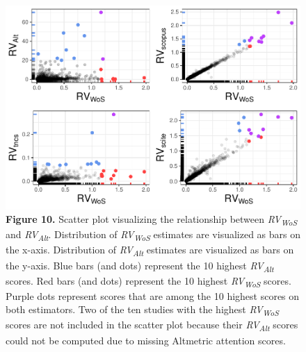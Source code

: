 \documentclass[
  man,floatsintext]{apa6}
\begin{document}
\begin{figure}
\centering
\includegraphics{RVcn_feasibility_in_social_neuroscience_cortex_files/figure-latex/fig10-1.pdf}
\caption{\label{fig:fig10}\textbf{Figure 10.} Scatter plot visualizing the relationship between \emph{RV\textsubscript{WoS}} and \emph{RV\textsubscript{Alt}}. Distribution of \emph{RV\textsubscript{WoS}} estimates are visualized as bars on the x-axis. Distribution of \emph{RV\textsubscript{Alt}} estimates are visualized as bars on the y-axis. Blue bars (and dots) represent the 10 highest \emph{RV\textsubscript{Alt}} scores. Red bars (and dots) represent the 10 highest \emph{RV\textsubscript{WoS}} scores. Purple dots represent scores that are among the 10 highest scores on both estimators. Two of the ten studies with the highest \emph{RV\textsubscript{WoS}} scores are not included in the scatter plot because their \emph{RV\textsubscript{Alt}} scores could not be computed due to missing Altmetric attention scores.}
\end{figure}
\end{document}
